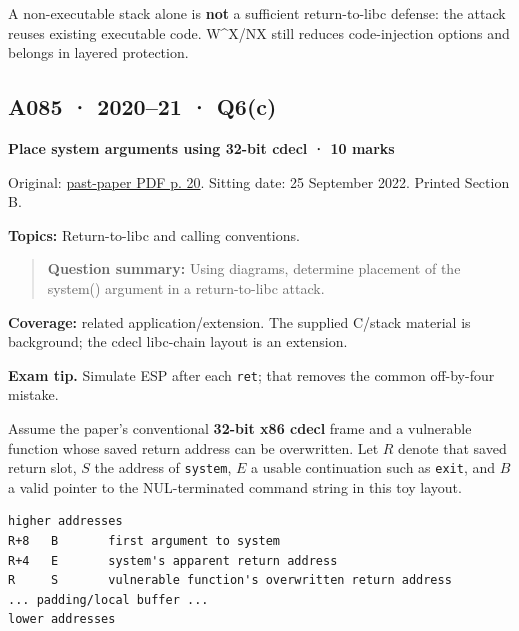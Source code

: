 \documentclass[11pt,a4paper]{article}
\begin{document}
A non-executable stack alone is \textbf{not} a sufficient return-to-libc defense: the attack reuses existing executable code. W\textasciicircum{}X/\allowbreak{}NX still reduces code-injection options and belongs in layered protection.




\clearpage
\subsection{A085 · 2020–21 · Q6(c)}\label{a085}

\textbf{Place system arguments using 32-bit cdecl · 10 marks}


Original: \href{../../CSE405-Security_Merged.pdf\#page=20}{past-paper PDF p. 20}. Sitting date: 25 September 2022. Printed Section B.


\textbf{Topics:} Return-to-libc and calling conventions.



\begin{quote}\small

\textbf{Question summary:} Using diagrams,\allowbreak{} determine placement of the system() argument in a return-to-libc attack.



\end{quote}

\textbf{Coverage:} related application/\allowbreak{}extension. The supplied C/\allowbreak{}stack material is background; the cdecl libc-chain layout is an extension.



{\color{ForestGreen}\textbf{Exam tip.} Simulate ESP after each \texttt{ret}; that removes the common off-by-four mistake.}


Assume the paper's conventional \textbf{32-bit x86 cdecl} frame and a vulnerable function whose saved return address can be overwritten. Let \(R\) denote that saved return slot,\allowbreak{} \(S\) the address of \texttt{system},\allowbreak{} \(E\) a usable continuation such as \texttt{exit},\allowbreak{} and \(B\) a valid pointer to the NUL-terminated command string in this toy layout.



\begin{Verbatim}[breaklines=true,breakanywhere=true,fontsize=\small,frame=single,rulecolor=\color{PanelBorder}]
higher addresses
R+8   B       first argument to system
R+4   E       system's apparent return address
R     S       vulnerable function's overwritten return address
... padding/local buffer ...
lower addresses
\end{Verbatim}
\end{document}

